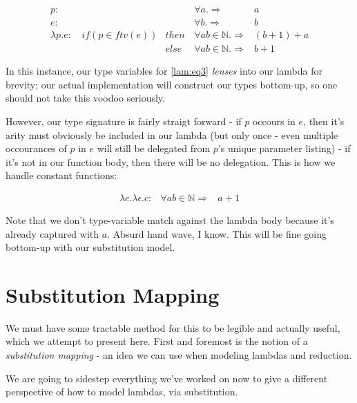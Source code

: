 \documentclass{article}
\begin{document}
\begin{align}
p :                  &&& \forall a. \Rightarrow & a\\
e :                  &&& \forall b. \Rightarrow & b\\
\lambda p.e : \, &
  if (p \in ftv(e)) & then \, & \forall a b \in \mathbb{N}. \Rightarrow
    & (b+1) + a\\
              &     & else \, & \forall a b \in \mathbb{N}. \Rightarrow
    & b+1 \label{lam:eq3}
\end{align}

\begin{flushleft}
In this instance, our type variables for \ref{lam:eq3} \textit{lenses} into our
lambda for brevity; our actual implementation will construct our types bottom-up,
so one should not take this voodoo seriously.

However, our type signature is fairly straigt forward - if $p$ occours in $e$,
then it's arity must obviously be included in our lambda (but only once - even
multiple occourances of $p$ in $e$ will still be delegated from $p$'s unique
parameter listing) - if it's not in our function body, then there will be no
delegation. This is how we handle constant functions:
\end{flushleft}

\begin{align}
\lambda c . \lambda \epsilon . c : & \forall a b \in \mathbb{N} \Rightarrow
  & a + 1
\end{align}

\begin{flushleft}
Note that we don't type-variable match against the lambda body
because it's already captured with $a$. Absurd hand wave, I know. This will be
fine going bottom-up with our substitution model.
\end{flushleft}

\section{Substitution Mapping}

\begin{flushleft}
We must have some tractable method for this to be legible and actually useful,
which we attempt to present here. First and foremost is the notion of a
\textit{substitution mapping} - an idea we can use when modeling lambdas and
reduction.

\vspace{2mm}
We are going to sidestep everything we've worked on now to give a different
perspective of how to model lambdas, via substitution.
\end{flushleft}
\end{document}
